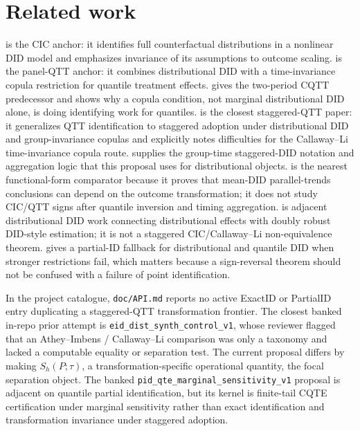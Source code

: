 \documentclass[11pt]{article}
\theoremstyle{definition}
\theoremstyle{plain}
\theoremstyle{remark}
\begin{document}
\section{Related work}
\citet{AtheyImbens2006} is the CIC anchor: it identifies full counterfactual
distributions in a nonlinear DID model and emphasizes invariance of its assumptions
to outcome scaling.  \citet{CallawayLi2019} is the panel-QTT anchor: it combines
distributional DID with a time-invariance copula restriction for quantile treatment
effects.  \citet{CallawayLiOka2018} gives the two-period CQTT predecessor and
shows why a copula condition, not marginal distributional DID alone, is doing
identifying work for quantiles.  \citet[Section~2]{LiLin2024} is the closest staggered-QTT
paper: it generalizes QTT identification to staggered adoption under distributional
DID and group-invariance copulas and explicitly notes difficulties for the
Callaway--Li time-invariance copula route.  \citet{CallawaySantAnna2021} supplies
the group-time staggered-DID notation and aggregation logic that this proposal
uses for distributional objects.  \citet[pp.~738--741 and Proposition~1]{RothSantAnna2023} is the nearest
functional-form comparator because it proves that mean-DID parallel-trends
conclusions can depend on the outcome transformation; it does not study CIC/QTT
signs after quantile inversion and timing aggregation.  \citet{FernandezValMeierVanVuurenVella2024}
is adjacent distributional DID work connecting distributional effects with
doubly robust DID-style estimation; it is not a staggered CIC/Callaway--Li
non-equivalence theorem.  \citet{FanYu2012} gives a partial-ID
fallback for distributional and quantile DID when stronger restrictions fail,
which matters because a sign-reversal theorem should not be confused with a
failure of point identification.

In the project catalogue, \texttt{doc/API.md} reports no active ExactID or
PartialID entry duplicating a staggered-QTT transformation frontier.  The closest
banked in-repo prior attempt is \texttt{eid\_dist\_synth\_control\_v1}, whose
reviewer flagged that an Athey--Imbens / Callaway--Li comparison was only a
taxonomy and lacked a computable equality or separation test.  The current
proposal differs by making \(S_h(P;\tau)\), a transformation-specific operational
quantity, the focal separation object.  The banked
\texttt{pid\_qte\_marginal\_sensitivity\_v1} proposal is adjacent on quantile
partial identification, but its kernel is finite-tail CQTE certification under
marginal sensitivity rather than exact identification and transformation
invariance under staggered adoption.
\end{document}
